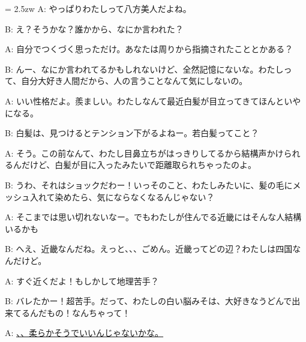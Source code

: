 \documentclass[11pt]{amsart}
\title{}
\author{}
\newenvironment{hangall}[1]{\hangindent = 2.5zw\everypar{\hangindent = 2.5zw}}{}
\begin{document}
\maketitle
\begin{hangall}{}%
A: やっぱりわたしって八方美人だよね。

B: え？そうかな？誰かから、なにか言われた？

A: 自分でつくづく思っただけ。あなたは周りから指摘されたこととかある？

B: んー、なにか言われてるかもしれないけど、全然記憶にないな。わたしって、自分大好き人間だから、人の言うことなんて気にしないの。

A: いい性格だよ。羨ましい。わたしなんて最近白髪が目立ってきてほんといやになる。

B: 白髪は、見つけるとテンション下がるよねー。若白髪ってこと？

A: そう。この前なんて、わたし目鼻立ちがはっきりしてるから結構声かけられるんだけど、白髪が目に入ったみたいで距離取られちゃったのよ。

B: うわ、それはショックだわー！いっそのこと、わたしみたいに、髪の毛にメッシュ入れて染めたら、気にならなくなるんじゃない？

A: そこまでは思い切れないなー。でもわたしが住んでる近畿にはそんな人結構いるかも

B: へえ、近畿なんだね。えっと、、、ごめん。近畿ってどの辺？わたしは四国なんだけど。

A: すぐ近くだよ！もしかして地理苦手？

B: バレたかー！超苦手。だって、わたしの白い脳みそは、大好きなうどんで出来てるんだもの！なんちゃって！

A: \ul{、、柔らかそうでいいんじゃないかな。}\end{hangall}
\end{document}
